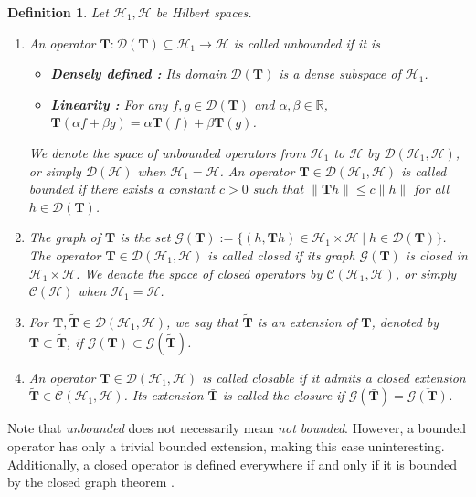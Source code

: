 \documentclass[noinfoline]{imsart}\setcounter{tocdepth}{2}
\renewcommand{\b}[1]{\mathbb{#1}} %
\newcommand{\m}[1]{\mathbf{#1}} %
\renewcommand{\c}[1]{\mathcal{#1}} %
\theoremstyle{plain}
\newtheorem{definition}{Definition}[section]
\begin{document}
\begin{definition}
Let $\c{H}_{1}, \c{H}$ be Hilbert spaces. 
\begin{enumerate}[leftmargin = *]
\item An operator $\m{T}: \c{D} (\m{T}) \subseteq \c{H}_{1} \rightarrow \c{H}$ is called \emph{unbounded} if it is
\begin{itemize}[leftmargin = *]
    \item [] \textbf{Densely defined :} Its domain $\c{D} (\m{T})$ is a dense subspace of $\c{H}_{1}$.
    \item [] \textbf{Linearity :} For any $f, g \in \c{D} (\m{T})$ and $\alpha, \beta \in \b{R}$, $\m{T}(\alpha f + \beta g) = \alpha \m{T}(f) +\beta \m{T} (g)$.
\end{itemize}
We denote the space of unbounded operators from $\c{H}_{1}$ to $\c{H}$ by $\c{D}(\c{H}_{1}, \c{H})$, or simply $\c{D}(\c{H})$ when $\c{H}_{1} = \c{H}$. An operator $\m{T} \in \c{D}(\c{H}_{1}, \c{H})$ is called \emph{bounded} if there exists a constant $c > 0$ such that $\|\m{T}h\| \le c \|h\|$ for all $h \in \c{D}(\m{T})$.

\item The \emph{graph} of $\m{T}$ is the set $\c{G}(\m{T}) := \{(h, \m{T}h) \in \c{H}_{1} \times \c{H} \mid h \in \c{D}(\m{T}) \}$.
The operator $\m{T} \in \c{D}(\c{H}_{1}, \c{H})$ is called \emph{closed} if its graph $\c{G}(\m{T})$ is closed in $\c{H}_{1} \times \c{H}$. We denote the space of closed operators by $\c{C}(\c{H}_{1}, \c{H})$, or simply $\c{C}(\c{H})$ when $\c{H}_{1} = \c{H}$.  

\item For $\m{T}, \tilde{\m{T}} \in \c{D}(\c{H}_{1}, \c{H})$, we say that $\tilde{\m{T}}$ is an \emph{extension} of $\m{T}$, denoted by $\m{T} \subset \tilde{\m{T}}$, if $\c{G}(\m{T}) \subset \c{G}(\tilde{\m{T}})$.

\item An operator $\m{T} \in \c{D}(\c{H}_{1}, \c{H})$ is called \emph{closable} if it admits a closed extension $\tilde{\m{T}} \in \c{C}(\c{H}_{1}, \c{H})$. Its extension $\bar{\m{T}}$ is called the \emph{closure} if $\c{G}(\bar{\m{T}}) = \overline{\c{G}(\m{T})}$. 
\end{enumerate}
\end{definition}

Note that \textit{unbounded} does not necessarily mean \textit{not bounded}. However, a bounded operator has only a trivial bounded extension, making this case uninteresting. Additionally, a closed operator is defined everywhere if and only if it is bounded by the closed graph theorem \cite{conway2019course}. 
\end{document}
